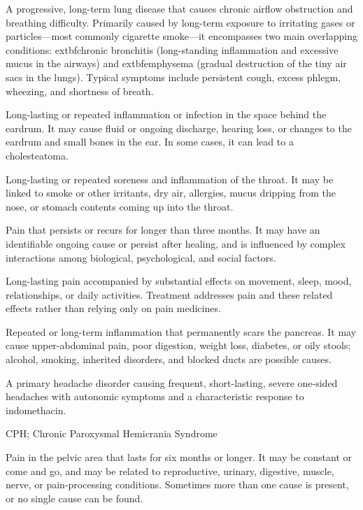  A progressive, long-term lung disease that causes chronic airflow obstruction and breathing difficulty. Primarily caused by long-term exposure to irritating gases or particles---most commonly cigarette smoke---it encompasses two main overlapping conditions:  extbf{chronic bronchitis} (long-standing inflammation and excessive mucus in the airways) and  extbf{emphysema} (gradual destruction of the tiny air sacs in the lungs). Typical symptoms include persistent cough, excess phlegm, wheezing, and shortness of breath.

 Long-lasting or repeated inflammation or infection in the space behind the eardrum. It may cause fluid or ongoing discharge, hearing loss, or changes to the eardrum and small bones in the ear. In some cases, it can lead to a cholesteatoma.

 Long-lasting or repeated soreness and inflammation of the throat. It may be linked to smoke or other irritants, dry air, allergies, mucus dripping from the nose, or stomach contents coming up into the throat.

 Pain that persists or recurs for longer than three months. It may have an identifiable ongoing cause or persist after healing, and is influenced by
complex interactions among biological, psychological, and social factors.

 Long-lasting pain accompanied by substantial effects on movement, sleep, mood, relationships, or daily activities. Treatment addresses pain and these related effects rather than relying only on pain medicines.

 Repeated or long-term inflammation that permanently scars the pancreas. It may cause upper-abdominal pain, poor digestion, weight loss, diabetes, or oily stools; alcohol, smoking, inherited disorders, and blocked ducts are possible causes.

 A primary headache disorder causing frequent, short-lasting, severe one-sided headaches with autonomic symptoms and a characteristic response to indomethacin.

\synonyms
CPH; Chronic Paroxysmal Hemicrania Syndrome

 Pain in the pelvic area that lasts for six months or longer. It may be constant or come and go, and may be related to reproductive, urinary, digestive, muscle, nerve, or pain-processing conditions. Sometimes more than one cause is present, or no single cause can be found.


